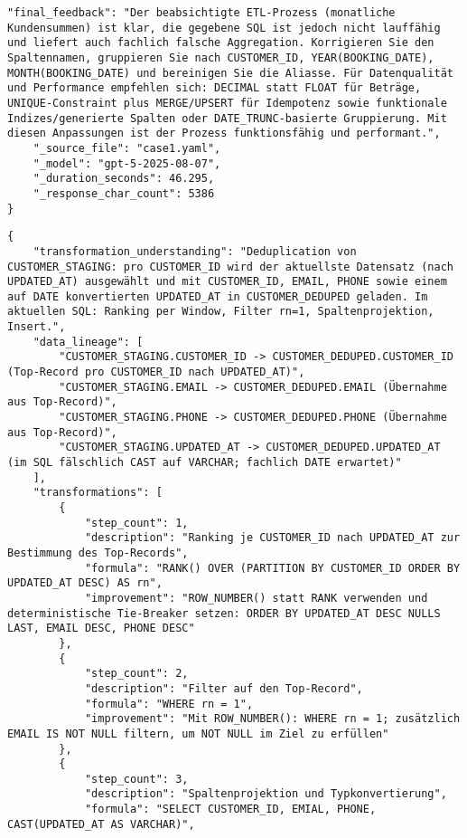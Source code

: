 \begin{lstlisting}[caption={Ausgabe: GPT-5 Anwendungsfall 1 Robustheitsdurchlauf},label={gpt_case1_prompt3}]
    "final_feedback": "Der beabsichtigte ETL-Prozess (monatliche Kundensummen) ist klar, die gegebene SQL ist jedoch nicht lauffähig und liefert auch fachlich falsche Aggregation. Korrigieren Sie den Spaltennamen, gruppieren Sie nach CUSTOMER_ID, YEAR(BOOKING_DATE), MONTH(BOOKING_DATE) und bereinigen Sie die Aliasse. Für Datenqualität und Performance empfehlen sich: DECIMAL statt FLOAT für Beträge, UNIQUE-Constraint plus MERGE/UPSERT für Idempotenz sowie funktionale Indizes/generierte Spalten oder DATE_TRUNC-basierte Gruppierung. Mit diesen Anpassungen ist der Prozess funktionsfähig und performant.",
    "_source_file": "case1.yaml",
    "_model": "gpt-5-2025-08-07",
    "_duration_seconds": 46.295,
    "_response_char_count": 5386
}
\end{lstlisting}

\begin{lstlisting}[caption={Ausgabe: GPT-5 Anwendungsfall 2 Hauptdurchlauf},label={gpt_case2_prompt1}]
{
    "transformation_understanding": "Deduplication von CUSTOMER_STAGING: pro CUSTOMER_ID wird der aktuellste Datensatz (nach UPDATED_AT) ausgewählt und mit CUSTOMER_ID, EMAIL, PHONE sowie einem auf DATE konvertierten UPDATED_AT in CUSTOMER_DEDUPED geladen. Im aktuellen SQL: Ranking per Window, Filter rn=1, Spaltenprojektion, Insert.",
    "data_lineage": [
        "CUSTOMER_STAGING.CUSTOMER_ID -> CUSTOMER_DEDUPED.CUSTOMER_ID (Top-Record pro CUSTOMER_ID nach UPDATED_AT)",
        "CUSTOMER_STAGING.EMAIL -> CUSTOMER_DEDUPED.EMAIL (Übernahme aus Top-Record)",
        "CUSTOMER_STAGING.PHONE -> CUSTOMER_DEDUPED.PHONE (Übernahme aus Top-Record)",
        "CUSTOMER_STAGING.UPDATED_AT -> CUSTOMER_DEDUPED.UPDATED_AT (im SQL fälschlich CAST auf VARCHAR; fachlich DATE erwartet)"
    ],
    "transformations": [
        {
            "step_count": 1,
            "description": "Ranking je CUSTOMER_ID nach UPDATED_AT zur Bestimmung des Top-Records",
            "formula": "RANK() OVER (PARTITION BY CUSTOMER_ID ORDER BY UPDATED_AT DESC) AS rn",
            "improvement": "ROW_NUMBER() statt RANK verwenden und deterministische Tie-Breaker setzen: ORDER BY UPDATED_AT DESC NULLS LAST, EMAIL DESC, PHONE DESC"
        },
        {
            "step_count": 2,
            "description": "Filter auf den Top-Record",
            "formula": "WHERE rn = 1",
            "improvement": "Mit ROW_NUMBER(): WHERE rn = 1; zusätzlich EMAIL IS NOT NULL filtern, um NOT NULL im Ziel zu erfüllen"
        },
        {
            "step_count": 3,
            "description": "Spaltenprojektion und Typkonvertierung",
            "formula": "SELECT CUSTOMER_ID, EMIAL, PHONE, CAST(UPDATED_AT AS VARCHAR)",

\end{lstlisting}
